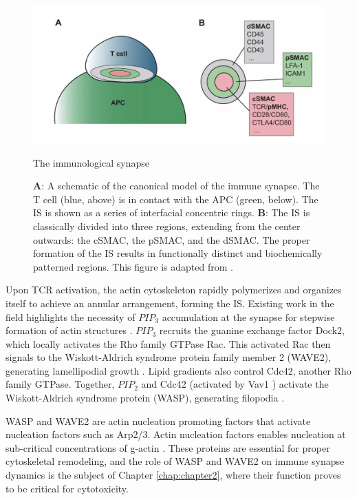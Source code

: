 \begin{figure}[htbp]
	\centering
	\includegraphics[width=\textwidth]{../figures/chapter1/immunesynapse.png}
	\caption{The immunological synapse}
	\caption*{\textbf{A}: A schematic of the canonical model of the immune synapse. The T cell (blue, above) is in contact with the APC (green, below). The IS is shown as a series of interfacial concentric rings.  \textbf{B}: The IS is classically divided into three regions, extending from the center outwards: the cSMAC, the pSMAC, and the dSMAC.  The proper formation of the IS results in functionally distinct and biochemically patterned regions.  This figure is adapted from \cite{Yu2013}.}
	\label{fig:immunesynapse}
\end{figure}

Upon TCR activation, the actin cytoskeleton rapidly polymerizes and organizes itself to achieve an annular arrangement, forming the IS. Existing work in the field highlights the necessity of $PIP_3$ accumulation at the synapse for stepwise formation of actin structures \cite{LeFloch2013}. $PIP_3$ recruits the guanine exchange factor Dock2, which locally activates the Rho family GTPase Rac. This activated Rac then signals to the Wiskott-Aldrich syndrome protein family member 2 (WAVE2), generating lamellipodial growth \cite{LeFloch2013, Derivery2010}. Lipid gradients also control Cdc42, another Rho family GTPase. Together, $PIP_2$ and Cdc42 (activated by Vav1 \cite{Abe2000}) activate the Wiskott-Aldrich syndrome protein (WASP), generating filopodia \cite{KennethE.PrehodaJessicaA.ScottR.DycheMullins2000}.

WASP and WAVE2 are actin nucleation promoting factors that activate nucleation factors such as Arp2/3. Actin nucleation factors enables nucleation at sub-critical concentrations of g-actin \cite{Carlsson2005}. These proteins are essential for proper cytoskeletal remodeling, and the role of WASP and WAVE2 on immune synapse dynamics is the subject of Chapter \ref{chap:chapter2}, where their function proves to be critical for cytotoxicity.

